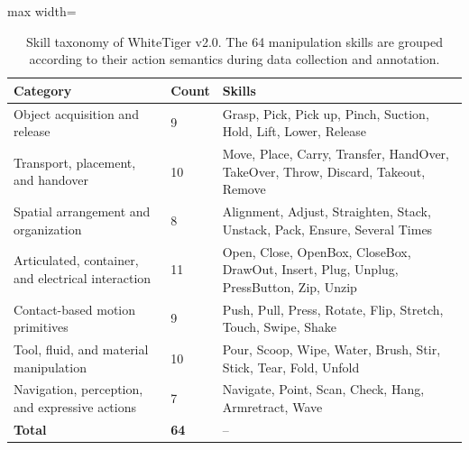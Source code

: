 
\begin{table}[t]
\centering
\caption{Skill taxonomy of WhiteTiger v2.0. The 64 manipulation skills are grouped according to their action semantics during data collection and annotation.}
\label{tab:skill-taxonomy}
\footnotesize
\setlength{\tabcolsep}{4pt}
\renewcommand{\arraystretch}{1.15}
\begin{adjustbox}{max width=\textwidth}
\begin{tabularx}{\textwidth}{p{}p{}X}
\toprule
Category & Count & Skills \\
\midrule
Object acquisition and release & 9 & Grasp, Pick, Pick up, Pinch, Suction, Hold, Lift, Lower, Release \\
Transport, placement, and handover & 10 & Move, Place, Carry, Transfer, HandOver, TakeOver, Throw, Discard, Takeout, Remove \\
Spatial arrangement and organization & 8 & Alignment, Adjust, Straighten, Stack, Unstack, Pack, Ensure, Several Times \\
Articulated, container, and electrical interaction & 11 & Open, Close, OpenBox, CloseBox, DrawOut, Insert, Plug, Unplug, PressButton, Zip, Unzip \\
Contact-based motion primitives & 9 & Push, Pull, Press, Rotate, Flip, Stretch, Touch, Swipe, Shake \\
Tool, fluid, and material manipulation & 10 & Pour, Scoop, Wipe, Water, Brush, Stir, Stick, Tear, Fold, Unfold \\
Navigation, perception, and expressive actions & 7 & Navigate, Point, Scan, Check, Hang, Armretract, Wave \\
\midrule
\textbf{Total} & \textbf{64} & -- \\
\bottomrule
\end{tabularx}
\end{adjustbox}
\end{table}

